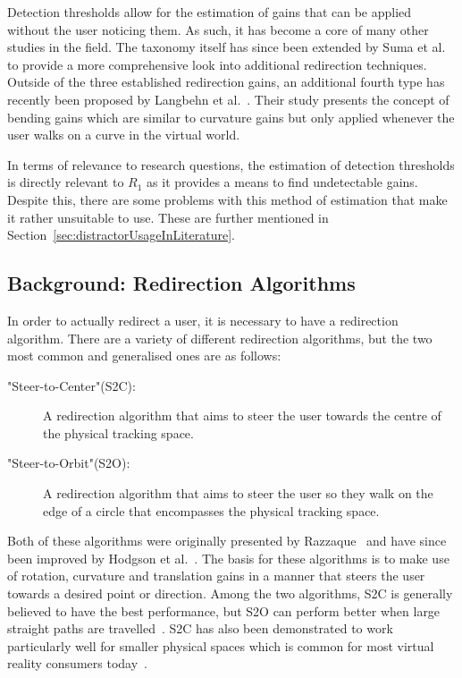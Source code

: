 Detection thresholds allow for the estimation of gains that can be applied without the user noticing them. As such, it has become a core of many other studies in the field. The taxonomy itself has since been extended by Suma et al.~\cite{suma2012taxonomy} to provide a more comprehensive look into additional redirection techniques. Outside of the three established redirection gains, an additional fourth type has recently been proposed by Langbehn et al.~\cite{7833190}. Their study presents the concept of bending gains which are similar to curvature gains but only applied whenever the user walks on a curve in the virtual world. 

In terms of relevance to research questions, the estimation of detection thresholds is directly relevant to $R_1$ as it provides a means to find undetectable gains. Despite this, there are some problems with this method of estimation that make it rather unsuitable to use. These are further mentioned in Section~\ref{sec:distractorUsageInLiterature}.

\subsection{Background: Redirection Algorithms}
In order to actually redirect a user, it is necessary to have a redirection algorithm. There are a variety of different redirection algorithms, but the two most common and generalised ones are as follows:
\begin{description}
    \item["Steer-to-Center"(S2C): ] A redirection algorithm that aims to steer the user towards the centre of the physical tracking space.
    \item["Steer-to-Orbit"(S2O): ] A redirection algorithm that aims to steer the user so they walk on the edge of a circle that encompasses the physical tracking space.
\end{description}
Both of these algorithms were originally presented by Razzaque~\cite{razzaque2005redirected} and have since been improved by Hodgson et al.~\cite{hodgson2013comparing}. The basis for these algorithms is to make use of rotation, curvature and translation gains in a manner that steers the user towards a desired point or direction. Among the two algorithms, S2C is generally believed to have the best performance, but S2O can perform better when large straight paths are travelled~\cite{hodgson2013comparing}. S2C has also been demonstrated to work particularly well for smaller physical spaces which is common for most virtual reality consumers today~\cite{azmandian2015physical}. 

